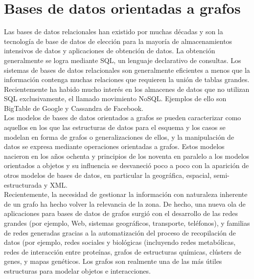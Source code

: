 \section{Bases de datos orientadas a grafos}
Las bases de datos relacionales han existido por muchas décadas y son la tecnología de base de datos de elección para la mayoría de almacenamientos intensivos de datos y aplicaciones de obtención de datos. La obtención generalmente se logra mediante SQL, un lenguaje declarativo de consultas. Los sistemas de bases de datos relacionales son generalmente eficientes a menos que la información contenga muchas relaciones que requieren la unión de tablas grandes. Recientemente ha habido mucho interés en los almacenes de datos que no utilizan SQL exclusivamente, el llamado movimiento NoSQL. Ejemplos de ello son BigTable de Google y Cassandra de Facebook. \cite{7}\\

Los modelos de bases de datos orientados a grafos se pueden caracterizar como aquellos en los que las estructuras de datos para el esquema y los casos se modelan en forma de grafos o generalizaciones de ellos, y la manipulación de datos se expresa mediante operaciones orientadas a grafos. Estos modelos nacieron en los años ochenta y principios de los noventa en paralelo a los modelos orientados a objetos y su influencia se desvaneció poco a poco con la aparición de otros modelos de bases de datos, en particular la geográfica, espacial, semi-estructurada y XML.\\

Recientemente, la necesidad de gestionar la información con naturaleza inherente de un grafo ha hecho volver la relevancia de la zona. De hecho, una nueva ola de aplicaciones para bases de datos de grafos surgió con el desarrollo de las redes grandes (por ejemplo, Web, sistemas geográficos, transporte, teléfonos), y familias de redes generadas gracias a la automatización del proceso de recopilación de datos (por ejemplo, redes sociales y biológicas (incluyendo redes metabólicas, redes de interacción entre proteínas, grafos de estructuras químicas, clústers de genes, y mapas genéticos. Los grafos son realmente una de las más útiles estructuras para modelar objetos e interacciones.\cite{8}\\

